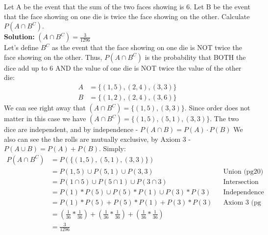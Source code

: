 \documentclass[12pt]{article}
\newenvironment{problem}[2][Problem]{\begin{trivlist}
\item[\hskip \labelsep {\bfseries #1}\hskip \labelsep {\bfseries #2.}]}{\end{trivlist}}
\begin{document}
\begin{problem}{2.3.16} Let A be the event that the sum of the two faces showing is 6. Let B be the event that the face showing on one die is twice the face showing on the other. Calculate $P(A \cap B^C)$. \\

\textbf{Solution:} $(A\cap B^C) = \frac{3}{1296} $ \\
 Let's define $B^C$ as the event that the face showing on one die is NOT twice the face showing on the other. Thus, $P(A \cap B^C)$ is the probability that BOTH the dice add up to 6 AND the value of one die is NOT twice the value of the other die: 
\begin{align*}
 A &= \{(1,5),(2,4),(3,3)\} \\
B &= \{(1,2),(2,4),(3,6)\} 
\end{align*}
We can see right away that $(A\cap B^C) =  \{(1,5),(3,3)\}$. Since order does not matter in this case we have $(A\cap B^C) =  \{(1,5),(5,1),(3,3)\}$. The two dice are independent, and by independence -  $P(A\cap B) = P(A)\cdot P(B)$ We also can see the the rolls are mutually exclusive, by Axiom 3 - $P(A\cup B)=P(A)+P(B)$. Simply: 
\begin{align*}
P(A\cap B^C) &=P( \{(1,5),(5,1),(3,3)\}) \\
&= P(1,5) \cup P(5,1) \cup P(3,3) && \text{Union (pg20)} \\
&= P(1 \cap 5) \cup P(5 \cap 1) \cup P(3 \cap 3) && \text{Intersection (pg 20)} \\
&= P(1)*P(5) \cup P(5)*P(1) \cup P(3)*P(3) && \text{Independence (pg 50)} \\
&= P(1)*P(5) + P(5)*P(1) + P(3)*P(3) && \text{Axiom 3 (pg 26)} \\
&= (\frac{1}{36}*\frac{1}{36}) + (\frac{1}{36}*\frac{1}{36}) + (\frac{1}{36}*\frac{1}{36}) \\
&= \frac{3}{1296}
\end{align*}
\\
\end{problem}
\end{document}
